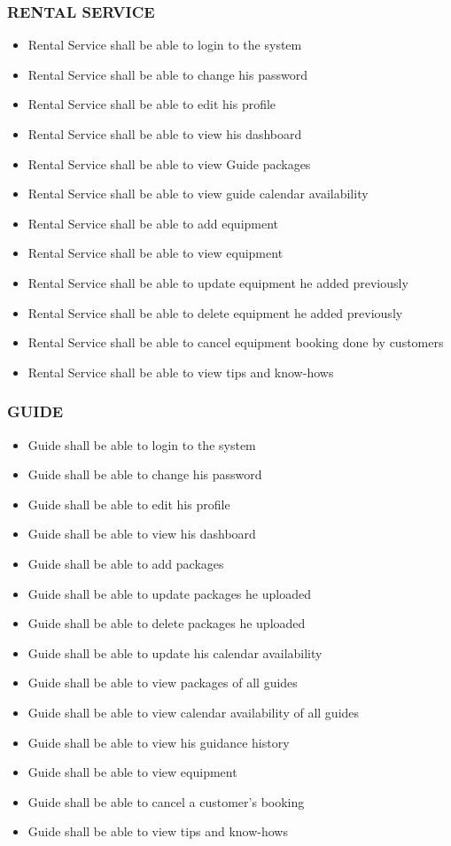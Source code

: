 \subsubsection*{RENTAL SERVICE}
\begin{itemize}
\itemsep0em 
    \item Rental Service shall be able to login to the system
    \item Rental Service shall be able to change his password 
    \item Rental Service shall be able to edit his profile
    \item Rental Service shall be able to view his dashboard
    \item Rental Service shall be able to view Guide packages
    \item Rental Service shall be able to view guide calendar availability
    \item Rental Service shall be able to add equipment
    \item Rental Service shall be able to view equipment
    \item Rental Service shall be able to update equipment he added previously 
    \item Rental Service shall be able to delete equipment  he added previously
    \item Rental Service shall be able to cancel equipment booking done by customers
    \item Rental Service shall be able to view tips and know-hows
\end{itemize}

\subsubsection*{GUIDE}
\begin{itemize}
\itemsep0em 
    \item Guide shall be able to login to the system
    \item Guide shall be able to change his password
    \item Guide shall be able to edit his profile
    \item Guide shall be able to view his dashboard
    \item Guide shall be able to add packages
    \item Guide shall be able to update packages he uploaded
    \item Guide shall be able to delete packages he uploaded
    \item Guide shall be able to update his calendar availability
    \item Guide shall be able to view packages of all guides
    \item Guide shall be able to view calendar availability of all guides
    \item Guide shall be able to view his guidance history
    \item Guide shall be able to view equipment
    \item Guide shall be able to cancel a customer’s booking
    \item Guide shall be able to view tips and know-hows
\end{itemize}

